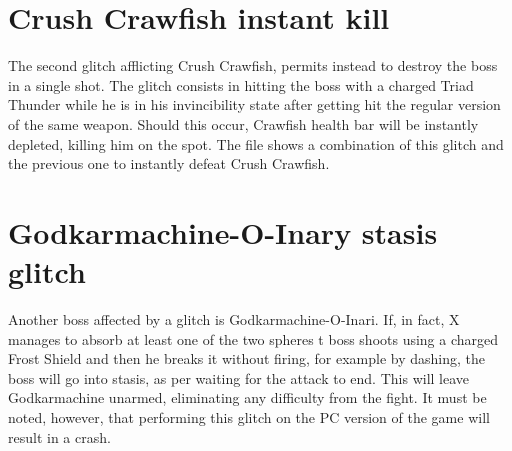 \section{Crush Crawfish instant kill}\label{glitch:Crawfish}
The second glitch afflicting Crush Crawfish, permits instead to destroy the boss in a single shot. The glitch consists in hitting the boss with a charged Triad Thunder while he is in his invincibility state after getting hit the regular version of the same weapon. Should this occur, Crawfish health bar will be instantly depleted, killing him on the spot. The file  shows a combination of this glitch and the previous one to instantly defeat Crush Crawfish.

\section{Godkarmachine-O-Inary stasis glitch}\label{glitch:Karmachine}
Another boss affected by a glitch is Godkarmachine-O-Inari. If, in fact, X manages to absorb at least one of the two spheres t boss shoots using a charged Frost Shield and then he breaks it without firing, for example by dashing, the boss will go into stasis, as per waiting for the attack to end. This will leave Godkarmachine unarmed, eliminating any difficulty from the fight. It must be noted, however, that performing this glitch on the PC version of the game will result in a crash.

